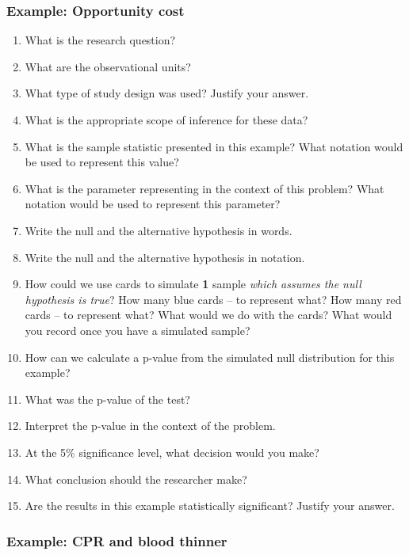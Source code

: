 \documentclass[
]{report}
\newcommand{\rgs}{\vspace{12pt}} %
\begin{document}
\hypertarget{example-opportunity-cost}{%
\subsubsection*{Example: Opportunity cost}\label{example-opportunity-cost}}

\begin{enumerate}
\def\labelenumi{\arabic{enumi}.}
\item
  What is the research question?
  \rgs
\item
  What are the observational units?
  \rgs
\item
  What type of study design was used? Justify your answer.
  \rgs
\item
  What is the appropriate scope of inference for these data?
  \rgs
\item
  What is the sample statistic presented in this example? What notation would be used to represent this value?
  \rgs
\item
  What is the parameter representing in the context of this problem? What notation would be used to represent this parameter?
  \rgs
  \rgs
\item
  Write the null and the alternative hypothesis in words.
  \rgs
  \rgs
\item
  Write the null and the alternative hypothesis in notation.
  \rgs
\item
  How could we use cards to simulate \textbf{1} sample \emph{which assumes the null hypothesis is true}? How many blue cards -- to represent what? How many red cards -- to represent what? What would we do with the cards? What would you record once you have a simulated sample?
  \rgs
  \rgs
\item
  How can we calculate a p-value from the simulated null distribution for this example?
  \rgs
  \rgs
\item
  What was the p-value of the test?
  \rgs
\item
  Interpret the p-value in the context of the problem.
  \rgs
  \rgs
\item
  At the 5\% significance level, what decision would you make?
  \rgs
\item
  What conclusion should the researcher make?
  \rgs
\item
  Are the results in this example statistically significant? Justify your answer.
  \rgs
\end{enumerate}

\hypertarget{example-cpr-and-blood-thinner}{%
\subsubsection*{Example: CPR and blood thinner}\label{example-cpr-and-blood-thinner}}
\end{document}
